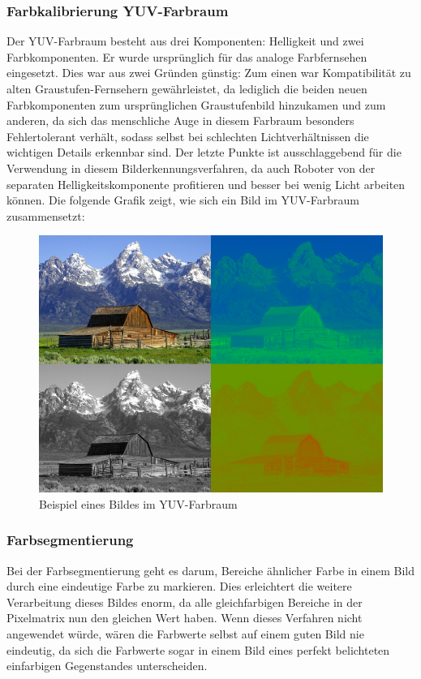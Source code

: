 \documentclass[a4paper,12pt]{article}
\begin{document}
\subsubsection{Farbkalibrierung YUV-Farbraum}
Der YUV-Farbraum besteht aus drei Komponenten: Helligkeit und zwei Farbkomponenten.
Er wurde ursprünglich für das analoge Farbfernsehen eingesetzt.
Dies war aus zwei Gründen günstig: Zum einen war Kompatibilität zu alten
Graustufen-Fernsehern gewährleistet, da lediglich die beiden neuen Farbkomponenten
zum ursprünglichen Graustufenbild hinzukamen und zum anderen, da sich das menschliche
Auge in diesem Farbraum besonders Fehlertolerant verhält, sodass selbst bei
schlechten Lichtverhältnissen die wichtigen Details erkennbar sind.
Der letzte Punkte ist ausschlaggebend für die Verwendung in diesem 
Bilderkennungsverfahren, da auch Roboter von der separaten
Helligkeitskomponente profitieren und besser bei wenig Licht arbeiten können.
\newpage
Die folgende Grafik zeigt, wie sich ein Bild im YUV-Farbraum zusammensetzt:
\begin{figure}[H]
    \includegraphics[scale=0.5]{Barn-yuv.png}
    \caption{Beispiel eines Bildes im YUV-Farbraum}
    \label{fig:yuv}
\end{figure}

\subsubsection{Farbsegmentierung}
Bei der Farbsegmentierung geht es darum, Bereiche ähnlicher Farbe in einem Bild
durch eine eindeutige Farbe zu markieren. Dies erleichtert die weitere
Verarbeitung dieses Bildes enorm, da alle gleichfarbigen Bereiche in der
Pixelmatrix nun den gleichen Wert haben. Wenn dieses Verfahren nicht angewendet
würde, wären die Farbwerte selbst auf einem guten Bild nie eindeutig, da sich
die Farbwerte sogar in einem Bild eines perfekt belichteten einfarbigen Gegenstandes
unterscheiden.
\end{document}
